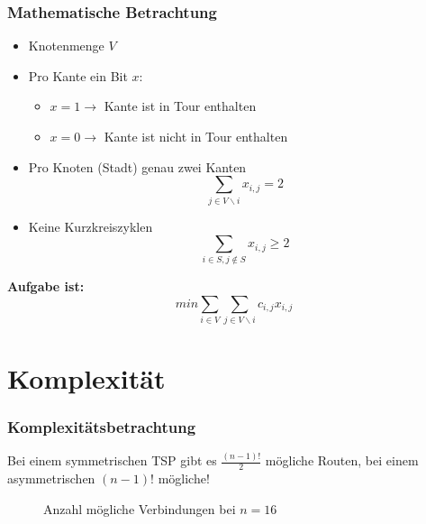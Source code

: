 \documentclass[handout]{beamer}
\begin{document}
  \begin{frame}
    \frametitle{Mathematische Betrachtung}
    \begin{itemize}
      \item Knotenmenge $V$
      \item Pro Kante ein Bit $x$:
      \begin{itemize}
        \item $x=1 \rightarrow$ Kante ist in Tour enthalten
        \item $x=0 \rightarrow$ Kante ist nicht in Tour enthalten 
      \end{itemize}
      \item
        Pro Knoten (Stadt) genau zwei Kanten
        $$\sum_{j \in V \backslash i}x_{i,j} = 2$$
      \item
        Keine Kurzkreiszyklen
        $$\sum_{i \in S, j \notin S}x_{i,j} \geq 2$$
    \end{itemize}
    \pause
    \textbf{Aufgabe ist:}
    $$min\sum_{i \in V} \sum_{j \in V \backslash i} c_{i,j}x_{i,j}$$
  \end{frame}

  \section{Komplexität}
  \begin{frame}
    \frametitle{Komplexitätsbetrachtung}
    Bei einem symmetrischen TSP gibt es $\frac{(n-1)!}{2}$ mögliche Routen,
    bei einem asymmetrischen $(n-1)!$ mögliche!

    \newcount\mycount

    \begin{figure}
      \centering
      \caption{Anzahl mögliche Verbindungen bei $n=16$}
    \end{figure}
  \end{frame}
\end{document}
